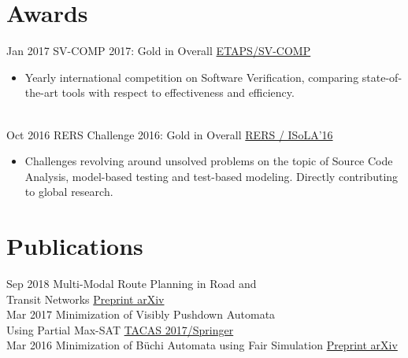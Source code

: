 \documentclass[letterpaper]{twentysecondcv} %
\begin{document}
\section{Awards}
\begin{twenty} %
	\twentyitem
    		{Jan 2017}
		{}
        		{SV-COMP 2017: Gold in Overall}
        		{\href{https://sv-comp.sosy-lab.org/2017/}{ETAPS/SV-COMP}}
        		{}
        		{\begin{itemize}
        			\item Yearly international competition on Software Verification, comparing state-of-the-art tools
        				with respect to effectiveness and efficiency.
        		\end{itemize}}\\
        	\twentyitem
    		{Oct 2016}
		{}
        		{RERS Challenge 2016: Gold in Overall}
        		{\href{http://rers-challenge.org/2016/}{RERS / ISoLA'16}}
        		{}
        		{\begin{itemize}
        			\item Challenges revolving around unsolved problems on the topic of Source Code Analysis,
        				model-based testing and test-based modeling. Directly contributing to global research.
        		\end{itemize}}
\end{twenty}

\vspace{6mm}


\section{Publications}
\begin{twenty} %
	\twentyitem
    		{Sep 2018}
		{}
        		{Multi-Modal Route Planning in Road and\\Transit Networks}
        		{\href{https://arxiv.org/abs/1809.05481}{Preprint arXiv}}
        		{}
        		{}\\
	\twentyitem
    		{Mar 2017}
		{}
        		{Minimization of Visibly Pushdown Automata\\Using Partial Max-SAT}
        		{\href{https://link.springer.com/chapter/10.1007/978-3-662-54577-5_27}{TACAS 2017/Springer}}
        		{}
        		{}\\
        	\twentyitem
    		{Mar 2016}
		{}
        		{Minimization of Büchi Automata using Fair Simulation}
        		{\href{https://arxiv.org/abs/1603.01107}{Preprint arXiv}}
        		{}
        		{}
\end{twenty}
\end{document}
